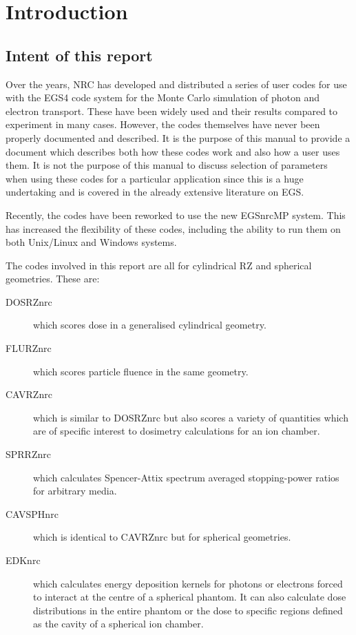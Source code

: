 \documentclass[12pt,twoside]{article}  %
\begin{document}

\setlength{\baselineskip}{0.1cm}

\tableofcontents

\listoftables
\listoffigures

\setlength{\baselineskip}{0.5cm}

\newpage

\renewcommand{\leftmark}{{INTRODUCTION}}
\section{Introduction}
\subsection{Intent of this report}

Over the years, NRC has developed and distributed a series of user codes
for use with the EGS4 code system for the Monte Carlo simulation of photon
and electron transport.  These have been widely used and their results
compared to experiment in many cases.  However, the codes themselves have
never been properly documented and described. It is the purpose of this
manual to provide a document which describes
both how these codes work and also how a user uses them.  It is not the
purpose of this manual to discuss selection of parameters when using these
codes for a particular application since this is a huge undertaking and is
covered in the already extensive literature on EGS.

Recently, the codes
have been reworked to use the new EGSnrcMP system\cite{Ka03}. This
has increased the flexibility of these codes, including the ability
to run them on both Unix/Linux and Windows systems.

The codes involved in this report are all for
cylindrical RZ and spherical geometries. These are:
\begin{description}

\item[DOSRZnrc] which scores dose in a generalised cylindrical geometry.

\item[FLURZnrc] which scores particle fluence in the same geometry.

\item[CAVRZnrc] which is similar to DOSRZnrc but also scores a variety of
quantities which are of specific interest to dosimetry
calculations for an ion chamber.

\item[SPRRZnrc] which calculates Spencer-Attix spectrum averaged
stopping-power ratios for arbitrary media.

\item[CAVSPHnrc] which is identical to CAVRZnrc but for spherical
geometries.

\item[EDKnrc] which calculates energy deposition kernels for photons
or electrons forced to interact at the centre of a spherical phantom.
It can also calculate dose distributions in the entire phantom or the
dose to specific regions defined as the cavity of a spherical ion chamber.

\end{description}
\end{document}
